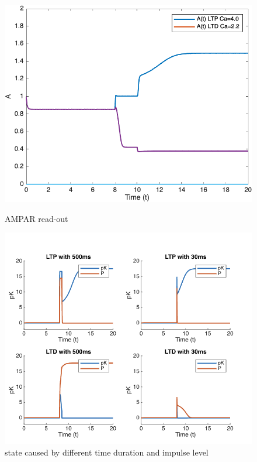 \documentclass{article}
\begin{document}
\begin{figure}[h]
    \centering
    \begin{minipage}[b]{0.45\textwidth}
        \includegraphics[width=\textwidth]{ampar.png}
        \caption{AMPAR read-out}
        \label{fig:image1}
    \end{minipage}
    \hfill %
    \begin{minipage}[b]{0.45\textwidth}
        \includegraphics[width=\textwidth]{4plot.png}
        \caption{state caused by different time duration and impulse level}
        \label{fig:image2}
    \end{minipage}
\end{figure}
\end{document}
